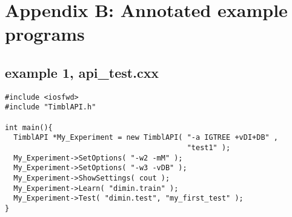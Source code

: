 \documentclass{article}
\begin{document}
\clearpage
\section{Appendix B: Annotated example programs}

\subsection{example 1, api\_test.cxx}
\begin{verbatim}	
#include <iosfwd>
#include "TimblAPI.h"

int main(){
  TimblAPI *My_Experiment = new TimblAPI( "-a IGTREE +vDI+DB" , 
                                          "test1" );
  My_Experiment->SetOptions( "-w2 -mM" );
  My_Experiment->SetOptions( "-w3 -vDB" );
  My_Experiment->ShowSettings( cout );
  My_Experiment->Learn( "dimin.train" );  
  My_Experiment->Test( "dimin.test", "my_first_test" );  
}

\end{verbatim}
\end{document}
